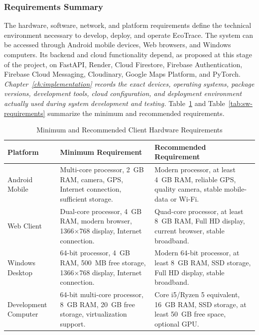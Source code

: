 \subsubsection{Requirements Summary}
The hardware, software, network, and platform requirements define the
technical environment necessary to develop, deploy, and operate EcoTrace.
The system can be accessed through Android mobile devices, Web browsers,
and Windows computers. Its backend and cloud functionality depend, as
proposed at this stage of the project, on FastAPI, Render, Cloud Firestore,
Firebase Authentication, Firebase Cloud Messaging, Cloudinary, Google Maps
Platform, and PyTorch. \textit{Chapter~\ref{ch:implementation} records the
exact devices, operating systems, package versions, development tools, cloud
configuration, and deployment environment actually used during system
development and testing.} Table~\ref{tab:hw-requirements} and
Table~\ref{tab:sw-requirements} summarize the minimum and recommended
requirements.

\begin{table}[H]
\centering
\small
\caption{Minimum and Recommended Client Hardware Requirements}
\label{tab:hw-requirements}
\begin{tabular}{@{}p{2.6cm}p{5.4cm}p{5.4cm}@{}}
\toprule
\textbf{Platform} & \textbf{Minimum Requirement} & \textbf{Recommended Requirement} \\
\midrule
Android Mobile & Multi-core processor, 2~GB RAM, camera, GPS, Internet connection, sufficient storage. & Modern processor, at least 4~GB RAM, reliable GPS, quality camera, stable mobile-data or Wi-Fi. \\
Web Client & Dual-core processor, 4~GB RAM, modern browser, 1366$\times$768 display, Internet connection. & Quad-core processor, at least 8~GB RAM, Full HD display, current browser, stable broadband. \\
Windows Desktop & 64-bit processor, 4~GB RAM, 500~MB free storage, 1366$\times$768 display, Internet connection. & Modern 64-bit processor, at least 8~GB RAM, SSD storage, Full HD display, stable broadband. \\
Development Computer & 64-bit multi-core processor, 8~GB RAM, 20~GB free storage, virtualization support. & Core i5/Ryzen 5 equivalent, 16~GB RAM, SSD storage, at least 50~GB free space, optional GPU. \\
\bottomrule
\end{tabular}
\end{table}

